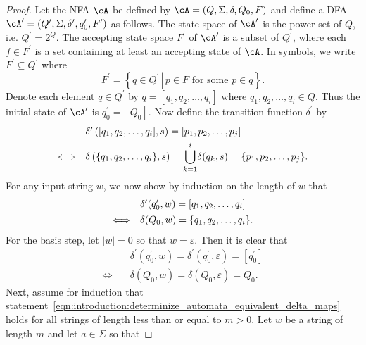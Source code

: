 \begin{proof}
Let the NFA $\cA$ be defined by $\cA = (Q, \Sigma, \delta, Q_0, F)$
and define a DFA
$\cA^\prime = (Q^\prime, \Sigma, \delta^\prime, q_0^\prime, F^\prime)$
as follows. The state space of $\cA^\prime$ is the power set of $Q$,
i.e. $Q^\prime = 2^Q$. The accepting state space $F^\prime$ of
$\cA^\prime$ is a subset of $Q^\prime$, where each $f \in F^\prime$
is a set containing at least an accepting state of $\cA$. In symbols,
we write $F^\prime \subseteq Q^\prime$ where
\[
F^\prime
=
\left\{
  q \in Q^\prime
  \,\left|\right.\,
  p \in F \text{ for some } p \in q
\right\}.
\]
Denote each element $q \in Q^\prime$ by $q = [q_1, q_2, \dots, q_i]$
where $q_1, q_2, \dots, q_i \in Q$. Thus the initial state of
$\cA^\prime$ is $q_0^\prime = [Q_0]$. Now define the transition
function $\delta^\prime$ by
\begin{equation}
\label{eqn:introduction:determinize_automata_delta_maps}
\begin{array}{r@{\quad}l}
& \delta^\prime \left( [q_1, q_2, \dots, q_i], s \right)
=
[p_1, p_2, \dots, p_j] \\[4pt]
\Longleftrightarrow
& \delta \left( \{q_1, q_2, \dots, q_i\}, s \right)
=
\displaystyle{\bigcup_{k=1}^i} \delta(q_k,s)
=
\{p_1, p_2, \dots, p_j\}.
\end{array}
\end{equation}
For any input string $w$, we now show by induction on the length of
$w$ that
\begin{equation}
\label{eqn:introduction:determinize_automata_equivalent_delta_maps}
\begin{array}{r@{\quad}l}
& \delta^\prime (q_0^\prime, w)
=
[q_1, q_2, \dots, q_i] \\[4pt]
\Longleftrightarrow
& \delta(Q_0, w)
=
\{q_1, q_2, \dots, q_i\}.
\end{array}
\end{equation}
For the basis step, let $|w| = 0$ so that $w = \varepsilon$. Then it
is clear that
\begin{align*}
&\quad \delta^\prime (q_0^\prime, w)
=
\delta^\prime (q_0^\prime, \varepsilon)
=
[q_0^\prime] \\
\Longleftrightarrow
&\quad \delta (Q_0, w)
=
\delta(Q_0, \varepsilon)
=
Q_0.
\end{align*}
Next, assume for induction that
statement~\eqref{eqn:introduction:determinize_automata_equivalent_delta_maps}
holds for all strings of length less than or equal to $m > 0$. Let $w$
be a string of length $m$ and let $a \in \Sigma$ so that

\end{proof}
